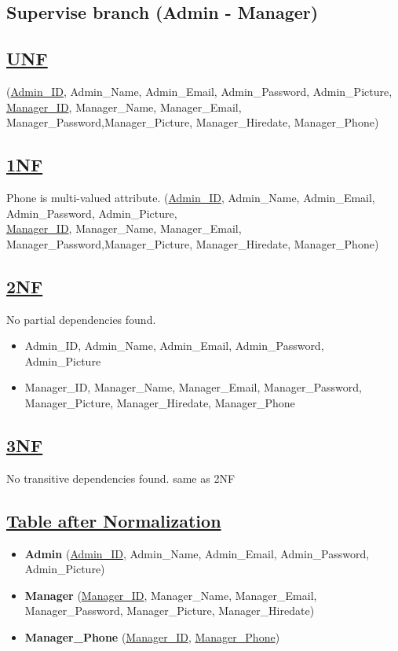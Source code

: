 \subsection*{\centering Supervise branch (Admin - Manager)}
\subsection*{\underline{UNF}}

(\underline{Admin\_ID}, Admin\_Name, Admin\_Email, Admin\_Password, Admin\_Picture,\\
\underline{Manager\_ID}, Manager\_Name, Manager\_Email, Manager\_Password,Manager\_Picture, Manager\_Hiredate, Manager\_Phone)

\subsection*{\underline{1NF}}
Phone is multi-valued attribute.
\vskip 0.2in
(\underline{Admin\_ID}, Admin\_Name, Admin\_Email, Admin\_Password, Admin\_Picture,\\
\underline{Manager\_ID}, Manager\_Name, Manager\_Email, Manager\_Password,Manager\_Picture, Manager\_Hiredate, Manager\_Phone)

\subsection*{\underline{2NF}}
No partial dependencies found.
\vskip 0.2in

\begin{itemize}
    \item Admin\_ID, Admin\_Name, Admin\_Email, Admin\_Password, Admin\_Picture
    \item Manager\_ID, Manager\_Name, Manager\_Email, Manager\_Password, Manager\_Picture, Manager\_Hiredate, Manager\_Phone
\end{itemize}

\subsection*{\underline{3NF}}
No transitive dependencies found.
\vskip 0.2in
same as 2NF

\subsection*{\underline{Table after Normalization}}
\vskip 0.2in
\begin{itemize}
    \item \textbf{Admin} (\underline{Admin\_ID}, Admin\_Name, Admin\_Email, Admin\_Password, Admin\_Picture)
    \item  \textbf{Manager} (\underline{Manager\_ID}, Manager\_Name, Manager\_Email, Manager\_Password, Manager\_Picture, Manager\_Hiredate)
    \item  \textbf{Manager\_Phone} (\underline{Manager\_ID}, \underline{Manager\_Phone})
\end{itemize}

